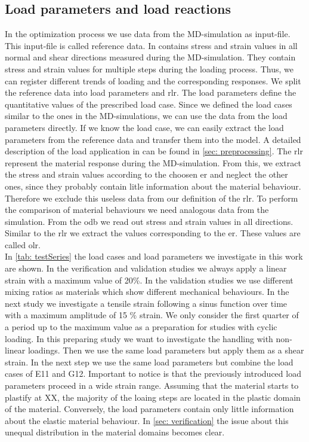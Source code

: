     \subsection{Load parameters and load reactions}\label{subsec:loadParameters}
    In the optimization process we use data from the MD-simulation as input-file. This input-file is called reference data. In contains stress and strain values in all normal and shear directions measured during the MD-simulation. They contain stress and strain values for multiple steps during the loading process. Thus, we can register different trends of loading and the corresponding responses.
    We split the reference data into load parameters and \acrfull{rlr}. The load parameters define the quantitative values of the prescribed load case. 
    Since we defined the load cases similar to the ones in the MD-simulations, we can use the data from the load parameters directly.  If we know the load case, we can easily extract the load parameters from the reference data and transfer them into the  model. A detailed description of the load application in  can be found in \autoref{sec: preprocessing}. 
    The \acrshort{rlr} represent the material response during the MD-simulation. From this, we extract the stress and strain values according to the choosen \acrlong{er} and neglect the other ones, since they probably contain litle information about the material behaviour. Therefore we exclude this useless data from our definition of the \acrshort{rlr}.
    To perform the comparison of material behaviours we need analogous data from the  simulation. From the odb we read out stress and strain values in all directions. Similar to the \acrshort{rlr} we extract the values corresponding to the \acrlong{er}. These values are called \acrfull{olr}. \\
    In \autoref{tab: testSeries} the load cases and load parameters we investigate in this work are shown.
    In the verification and validation studies we always apply a linear strain with a maximum value of 20\%. In the validation studies we use different mixing ratios as materials which show different mechanical behaviours. In the next study we investigate a tensile strain following a sinus function over time with a maximum amplitude of 15 \(\%\) strain. We only consider the first quarter of a period up to the maximum value as a preparation for studies with cyclic loading. In this preparing study we want to investigate the handling with non-linear loadings. Then we use the same load parameters but apply them as a shear strain. In the next step we use the same load parameters but combine the load cases of E11 and G12. Important to notice is that the previously introduced load parameters proceed in a wide strain range. Assuming that the material starts to plastify at XX, the majority of the loaing steps are located in the plastic domain of the material. Conversely, the load parameters contain only little information about the elastic material behaviour. In \autoref{sec: verification} the issue about this unequal distribution in the material domains becomes clear.    
